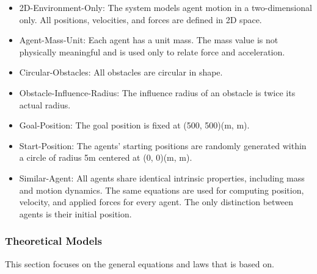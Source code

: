 \documentclass[12pt]{article}
\newcounter{assumpnum} %
\begin{document}
\begin{itemize}

\item[A\refstepcounter{assumpnum}\theassumpnum \label{A_2dOnly}:] 
2D-Environment-Only: The system models agent motion in a two-dimensional only. 
All positions, velocities, and forces are defined in 2D space.
\item[A\refstepcounter{assumpnum}\theassumpnum \label{A_agentMass}:] 
Agent-Mass-Unit: Each agent has a unit mass. The mass value is not physically 
meaningful and is used only to relate force and acceleration.
\item[A\refstepcounter{assumpnum}\theassumpnum \label{A_obsShape}:] 
Circular-Obstacles: All obstacles are circular in shape.
\item[A\refstepcounter{assumpnum}\theassumpnum \label{A_obsInfluence}:] 
Obstacle-Influence-Radius: The influence radius of an obstacle is twice its 
actual radius.
\item[A\refstepcounter{assumpnum}\theassumpnum \label{A_goalPosition}:] 
Goal-Position: The goal position is fixed at (500, 500)(m, m).
\item[A\refstepcounter{assumpnum}\theassumpnum \label{A_startPosition}:] 
Start-Position: The agents' starting positions are randomly generated within 
a circle of radius 5m centered at (0, 0)(m, m).
\item[A\refstepcounter{assumpnum}\theassumpnum \label{A_similarAgent}:] 
Similar-Agent: All agents share identical intrinsic properties, including 
mass and motion dynamics. The same equations are used for computing position, 
velocity, and applied forces for every agent. The only distinction between 
agents is their initial position.

\end{itemize}

\subsubsection{Theoretical Models}\label{sec_theoretical}

This section focuses on the general equations and laws that \progname{} is based
on.

~\newline
\end{document}
